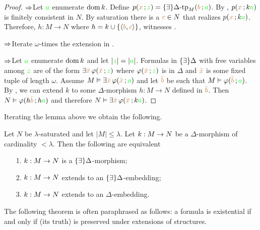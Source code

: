 \begin{proof}
$\Rightarrow$\quad Let ${\color{green} a}$ enumerate $\mathop{\rm dom} k$. Define $p({\color{brown} x}\,;{\color{green} z})=\{\exists\}\Delta\mbox{\rm -tp}_M ({\color{brown} b}\,;{\color{green} a})$. By , $p({\color{brown} x}\,;k{\color{green} a})$ is finitely consistent in $N$. By saturation there is a ${\color{brown} c}\in N$ that realizes $p({\color{brown} x}\,;k{\color{green} a})$. Therefore, $h:M\to N$ where $h=k\cup\{\langle{\color{brown}b},{\color{brown} c}\rangle\}$, witnesses .

$\Rightarrow$\quad Iterate $\omega$-times the extension in . 

$\Rightarrow$\quad Let ${\color{green} a}$ enumerate $\mathop{\rm dom} k$ and let $|{\color{green} z}|=|{\color{green} a}|$. Formulas in $\{\exists\}\Delta$ with free variables among ${\color{green} z}$ are of the form  $\exists {\color{brown}\bar x}\, \varphi ({\color{brown}\bar x}\,;{\color{green} z})$ where $\varphi({\color{brown}\bar x}\,;{\color{green} z})$ is in $\Delta$ and ${\color{brown}\bar x}$ is some fixed tuple of length $\omega$. Assume $M\vDash\exists{\color{brown}\bar x}\,\varphi({\color{brown}\bar x}\,;{\color{green} a})$ and let ${\color{brown}\bar b}$ be such that $M\vDash\varphi({\color{brown}\bar b}\,;{\color{green} a})$. By , we can extend $k$ to some $\Delta$-morphism $h:M\to N$ defined in ${\color{brown}\bar b}$. Then $N\vDash\varphi(h{\color{brown}\bar b}\,;h{\color{green} a})$ and therefore $N\vDash\exists {\color{brown}\bar x}\,\varphi({\color{brown}\bar x}\,;k{\color{green} a})$.
\end{proof}

Iterating the lemma above we obtain the following.

\begin{corollary}\label{corol_EDelta_estensione}
Let $N$ be $\lambda$-saturated and let $|M|\le\lambda$. Let $k:M\rightarrow N$ be a $\Delta$-morphism of cardinality $<\lambda$. Then the following are equivalent
\begin{itemize}
\item[1.] $k:M\rightarrow N$ is a $\{\exists\}\Delta$-morphism;
\item[2.] $k:M\rightarrow N$ extends to an $\{\exists\}\Delta$-embedding;
\item[3.] $k:M\rightarrow N$ extends to an $\Delta$-embedding.\QED
\end{itemize}
\end{corollary}

The following theorem is often paraphrased as follows: a formula is existential if and only if (its truth) is preserved under extensions of structures.

